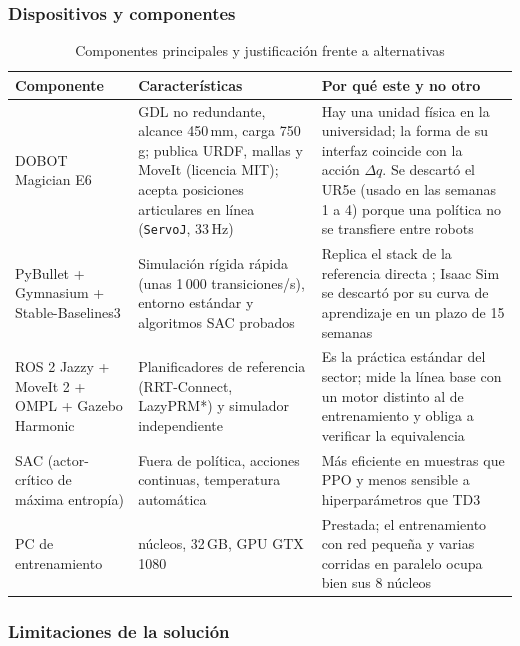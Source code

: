 \documentclass[11pt,a4paper,twoside]{article}
\begin{document}
\subsubsection{Dispositivos y componentes}

\begin{table}[H]
\centering
\caption{Componentes principales y justificación frente a alternativas}
\label{tab:componentes}
\small
\renewcommand{\arraystretch}{1.25}
\begin{tabularx}{\textwidth}{@{}>{\raggedright\arraybackslash}p{3.3cm}>{\raggedright\arraybackslash}X>{\raggedright\arraybackslash}X@{}}
\toprule
\textbf{Componente} & \textbf{Características} & \textbf{Por qué este y no otro} \\
\midrule
DOBOT Magician E6 & 6 GDL no redundante, alcance 450\,mm, carga 750\,g; publica URDF, mallas y MoveIt (licencia MIT); acepta posiciones articulares en línea (\texttt{ServoJ}, 33\,Hz) & Hay una unidad física en la universidad; la forma de su interfaz coincide con la acción $\Delta q$. Se descartó el UR5e (usado en las semanas 1 a 4) porque una política no se transfiere entre robots \\
PyBullet + Gymnasium + Stable-Baselines3 & Simulación rígida rápida (unas 1\,000 transiciones/s), entorno estándar y algoritmos SAC probados & Replica el stack de la referencia directa \cite{mao2025}; Isaac Sim se descartó por su curva de aprendizaje en un plazo de 15 semanas \\
ROS 2 Jazzy + MoveIt 2 + OMPL + Gazebo Harmonic & Planificadores de referencia (RRT-Connect, LazyPRM*) y simulador independiente & Es la práctica estándar del sector; mide la línea base con un motor distinto al de entrenamiento y obliga a verificar la equivalencia \\
SAC (actor-crítico de máxima entropía) & Fuera de política, acciones continuas, temperatura automática & Más eficiente en muestras que PPO y menos sensible a hiperparámetros que TD3 \\
PC de entrenamiento & 8 núcleos, 32\,GB, GPU GTX 1080 & Prestada; el entrenamiento con red pequeña y varias corridas en paralelo ocupa bien sus 8 núcleos \\
\bottomrule
\end{tabularx}
\end{table}

\subsubsection{Limitaciones de la solución}
\end{document}
